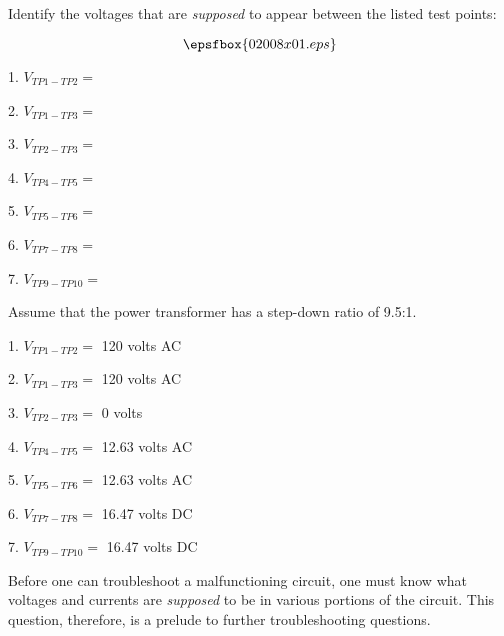 

Identify the voltages that are {\it supposed} to appear between the listed test points:

$$\epsfbox{02008x01.eps}$$

\medskip
\goodbreak
\item{1.} $V_{TP1-TP2} =$
\item{2.} $V_{TP1-TP3} =$
\item{3.} $V_{TP2-TP3} =$
\item{4.} $V_{TP4-TP5} =$
\item{5.} $V_{TP5-TP6} =$
\item{6.} $V_{TP7-TP8} =$
\item{7.} $V_{TP9-TP10} =$
\medskip

Assume that the power transformer has a step-down ratio of 9.5:1.







\medskip
\goodbreak
\item{1.} $V_{TP1-TP2} =$ 120 volts AC
\item{2.} $V_{TP1-TP3} =$ 120 volts AC
\item{3.} $V_{TP2-TP3} =$ 0 volts
\item{4.} $V_{TP4-TP5} =$ 12.63 volts AC
\item{5.} $V_{TP5-TP6} =$ 12.63 volts AC
\item{6.} $V_{TP7-TP8} =$ 16.47 volts DC
\item{7.} $V_{TP9-TP10} =$ 16.47 volts DC
\medskip







Before one can troubleshoot a malfunctioning circuit, one must know what voltages and currents are {\it supposed} to be in various portions of the circuit.  This question, therefore, is a prelude to further troubleshooting questions.




